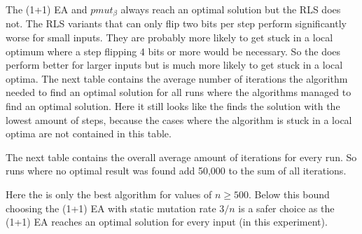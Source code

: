 

The (1+1) EA and $pmut_\beta$ always reach an optimal solution but the RLS does not.
The RLS variants that can only flip two bits per step perform significantly worse for small inputs.
They are probably more likely to get stuck in a local optimum where a step flipping 4 bits or more would be necessary.
So the \RLSN[2] does perform better for larger inputs but is much more likely to get stuck in a local optima.
The next table contains the average number of iterations the algorithm needed to find an optimal solution for all runs where the algorithms managed to find an optimal solution.
Here it still looks like the \RLSN[2] finds the solution with the lowest amount of steps, because the cases where the algorithm is stuck in a local optima are not contained in this table.



The next table contains the overall average amount of iterations for every run.
So runs where no optimal result was found add 50,000 to the sum of all iterations.



Here the \RLSN[2] is only the best algorithm for values of $n \ge 500$.
Below this bound choosing the (1+1) EA with static mutation rate $3/n$ is a safer choice as the (1+1) EA reaches an optimal solution for every input (in this experiment).
